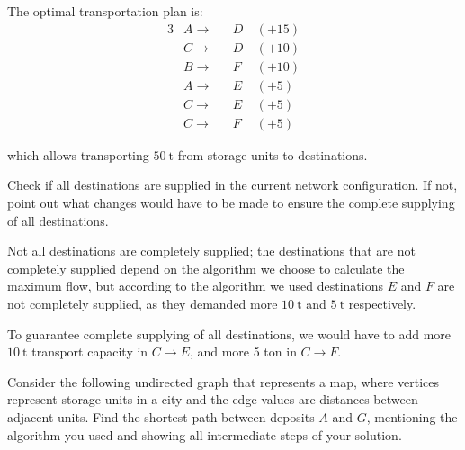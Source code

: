 \documentclass{cal}
\begin{document}
{The optimal transportation plan is:
\begin{alignat*}{3}
    & A \rightarrow && D~& (+15) \\
    & C \rightarrow && D~& (+10) \\
    & B \rightarrow && F~& (+10) \\
    & A \rightarrow && E~& (+5) \\
    & C \rightarrow && E~& (+5) \\
    & C \rightarrow && F~& (+5)
\end{alignat*}

which allows transporting $\SI{50}{\tonne}$ from storage units to destinations.

Check if all destinations are supplied in the current network configuration. If not, point out what changes would have to be made to ensure the complete supplying of all destinations.

\ansseparator

Not all destinations are completely supplied; the destinations that are not completely supplied depend on the algorithm we choose to calculate the maximum flow, but according to the algorithm we used destinations $E$ and $F$ are not completely supplied, as they demanded more $\SI{10}{\tonne}$ and $\SI{5}{\tonne}$ respectively. 

To guarantee complete supplying of all destinations, we would have to add more $\SI{10}{\tonne}$ transport capacity in $C \rightarrow E$, and more 5 ton in $C \rightarrow F$.

Consider the following undirected graph that represents a map, where vertices represent storage units in a city and the edge values are distances between adjacent units. Find the shortest path between deposits $A$ and $G$, mentioning the algorithm you used and showing all intermediate steps of your solution.

\begin{center}
\end{center}}
\end{document}
